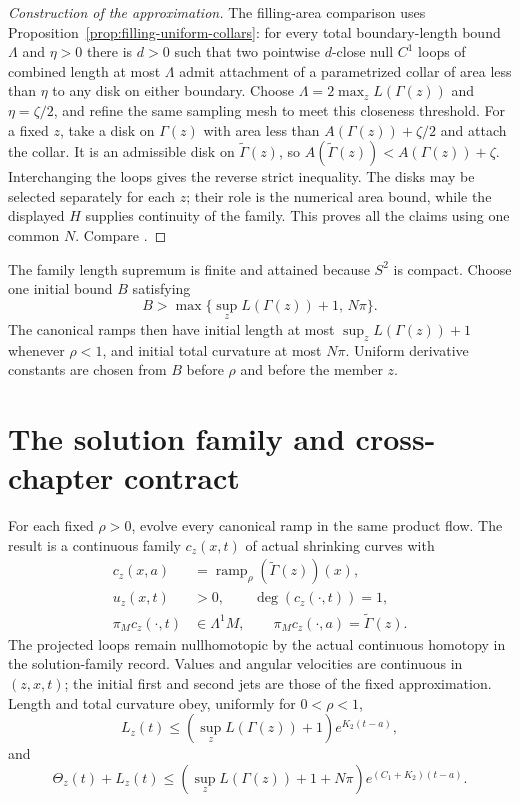 \begin{proof}[Construction of the approximation]
The filling-area comparison uses
Proposition~\ref{prop:filling-uniform-collars}: for every total
boundary-length bound $\Lambda$ and $\eta>0$
there is $d>0$ such that two pointwise $d$-close null $C^1$ loops of combined
length at most $\Lambda$ admit attachment of a parametrized collar of area
less than $\eta$ to any disk on either boundary.  Choose
$\Lambda=2\max_zL(\Gamma(z))$ and $\eta=\zeta/2$, and refine the same
sampling mesh to meet this closeness threshold.  For a fixed $z$, take a
disk on $\Gamma(z)$ with area less than $A(\Gamma(z))+\zeta/2$ and attach
the collar.  It is an admissible disk on $\widetilde\Gamma(z)$, so
$A(\widetilde\Gamma(z))<A(\Gamma(z))+\zeta$.
Interchanging the loops gives the reverse strict inequality.  The disks
may be selected separately for each $z$; their role is the numerical area
bound, while the displayed $H$ supplies continuity of the family.
This proves all the claims using one common $N$.
Compare \cite[Lemma 19.17, pp.~449--453]{MT2007}.
\end{proof}

The family length supremum is finite and attained because $S^2$ is compact.
Choose one initial bound $B$ satisfying
\[
 B>\max\{\sup_zL(\Gamma(z))+1,\,N\pi\}.
\]
The canonical ramps then have initial length at most
$\sup_zL(\Gamma(z))+1$ whenever $\rho<1$, and initial total curvature at
most $N\pi$.  Uniform derivative constants are chosen from $B$ before
$\rho$ and before the member $z$.

\section{The solution family and cross-chapter contract}
\label{sec:ramps-family-solutions}

For each fixed $\rho>0$, evolve every canonical ramp in the same product flow.
The result is a continuous family $c_z(x,t)$ of actual shrinking curves with
\begin{align*}
 c_z(x,a)&=\operatorname{ramp}_\rho(\widetilde\Gamma(z))(x),\\
 u_z(x,t)&>0,\qquad \deg(c_z(\cdot,t))=1,\\
 \pi_Mc_z(\cdot,t)&\in\Lambda^1M,\qquad
 \pi_Mc_z(\cdot,a)=\widetilde\Gamma(z).
\end{align*}
The projected loops remain nullhomotopic by the actual continuous homotopy
in the solution-family record.  Values and angular velocities are continuous
in $(z,x,t)$; the initial first and second jets are those of the fixed
approximation.  Length and total curvature obey, uniformly for $0<\rho<1$,
\[
 L_z(t)\leq (\sup_zL(\Gamma(z))+1)e^{K_2(t-a)},
\]
and
\[
 \Theta_z(t)+L_z(t)\leq
 (\sup_zL(\Gamma(z))+1+N\pi)
 e^{(C_1+K_2)(t-a)}.
\]


